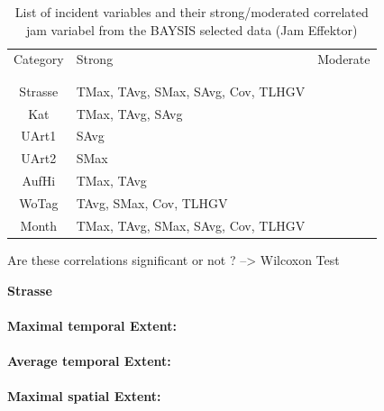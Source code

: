 \begin{table}[ht]
\noindent
\begin{table}[h!]
	\centering
	\begin{tabular}{c|l|l}  
		Category & Strong & Moderate \\
		\\[-1em]
		\hline
		\\[-1em]
		Strasse & TMax, TAvg, SMax, SAvg, Cov, TLHGV & \\ 
 		Kat & TMax, TAvg, SAvg & \\ 
 		UArt1 & SAvg & \\
 		UArt2 & SMax & \\
 		AufHi & TMax, TAvg & \\
 		WoTag & TAvg, SMax, Cov, TLHGV & \\
 		Month & TMax, TAvg, SMax, SAvg, Cov, TLHGV & \\
	\end{tabular}
	\caption{List of incident variables and their strong/moderated correlated jam variabel from the BAYSIS selected data (Jam Effektor)}
\end{table}

Are these correlations significant or not ? --> Wilcoxon Test

\large
\centerline{\textbf{Strasse}}
\normalsize

\paragraph{Maximal temporal Extent:}
\paragraph{Average temporal Extent:}
\paragraph{Maximal spatial Extent:}

\end{table}
